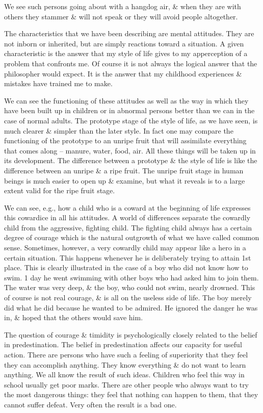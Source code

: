 \documentclass{article}
\begin{document}
We see such persons going about with a hangdog air, \& when they are with others they stammer \& will not speak or they will avoid people altogether.

The characteristics that we have been describing are mental attitudes. They are not inborn or inherited, but are simply reactions toward a situation. A given characteristic is the answer that my style of life gives to my apperception of a problem that confronts me. Of course it is not always the logical answer that the philosopher would expect. It is the answer that my childhood experiences \& mistakes have trained me to make.

We can see the functioning of these attitudes as well as the way in which they have been built up in children or in abnormal persons better than we can in the case of normal adults. The prototype stage of the style of life, as we have seen, is much clearer \& simpler than the later style. In fact one may compare the functioning of the prototype to an unripe fruit that will assimilate everything that comes along -- manure, water, food, air. All these things will be taken up in its development. The difference between a prototype \& the style of life is like the difference between an unripe \& a ripe fruit. The unripe fruit stage in human beings is much easier to open up \& examine, but what it reveals is to a large extent valid for the ripe fruit stage.

We can see, e.g., how a child who is a coward at the beginning of life expresses this cowardice in all his attitudes. A world of differences separate the cowardly child from the aggressive, fighting child. The fighting child always has a certain degree of courage which is the natural outgrowth of what we have called common sense. Sometimes, however, a very cowardly child may appear like a hero in a certain situation. This happens whenever he is deliberately trying to attain 1st place. This is clearly illustrated in the case of a boy who did not know how to swim. 1 day he went swimming with other boys who had asked him to join them. The water was very deep, \& the boy, who could not swim, nearly drowned. This of course is not real courage, \& is all on the useless side of life. The boy merely did what he did because he wanted to be admired. He ignored the danger he was in, \& hoped that the others would save him.

The question of courage \& timidity is psychologically closely related to the belief in predestination. The belief in predestination affects our capacity for useful action. There are persons who have such a feeling of superiority that they feel they can accomplish anything. They know everything \& do not want to learn anything. We all know the result of such ideas. Children who feel this way in school usually get poor marks. There are other people who always want to try the most dangerous things: they feel that nothing can happen to them, that they cannot suffer defeat. Very often the result is a bad one.
\end{document}
